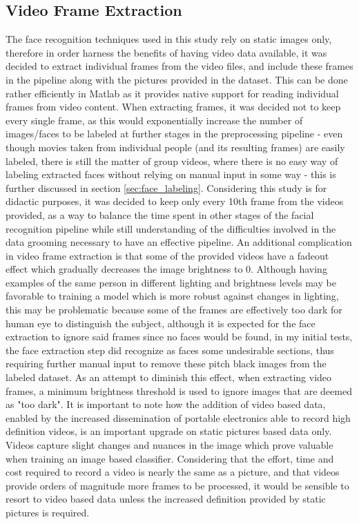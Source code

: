 \documentclass[11pt]{article}
\begin{document}
    \subsection{Video Frame Extraction}
        The face recognition techniques used in this study rely on static images only, therefore in order harness the benefits of having video data available, it was decided to extract individual frames from the video files, and include these frames in the pipeline along with the pictures provided in the dataset. This can be done rather efficiently in Matlab as it provides native support for reading individual frames from video content. When extracting frames, it was decided not to keep every single frame, as this would exponentially increase the number of images/faces to be labeled at further stages in the preprocessing pipeline - even though movies taken from individual people (and its resulting frames) are easily labeled, there is still the matter of group videos, where there is no easy way of labeling extracted faces without relying on manual input in some way - this is further discussed in section \ref{sec:face_labeling}. Considering this study is for didactic purposes, it was decided to keep only every 10th frame from the videos provided, as a way to balance the time spent in other stages of the facial recognition pipeline while still understanding of the difficulties involved in the data grooming necessary to have an effective pipeline. An additional complication in video frame extraction is that some of the provided videos have a fadeout effect which gradually decreases the image brightness to 0. Although having examples of the same person in different lighting and brightness levels may be favorable to training a model which is more robust against changes in lighting, this may be problematic because some of the frames are effectively too dark for human eye to distinguish the subject, although it is expected for the face extraction to ignore said frames since no faces would be found, in my initial tests, the face extraction step did recognize as faces some undesirable sections, thus requiring further manual input to remove these pitch black images from the labeled dataset. As an attempt to diminish this effect, when extracting video frames, a minimum brightness threshold is used to ignore images that are deemed as "too dark".
        It is important to note how the addition of video based data, enabled by the increased dissemination of portable electronics able to record high definition videos, is an important upgrade on static pictures based data only. Videos capture slight changes and nuances in the image which prove valuable when training an image based classifier. Considering that the effort, time and cost required to record a video is nearly the same as a picture, and that videos provide orders of magnitude more frames to be processed, it would be sensible to resort to video based data unless the increased definition provided by static pictures is required.
\end{document}
